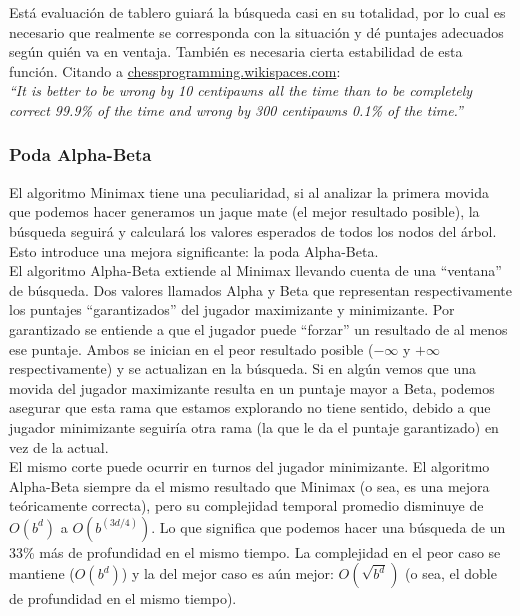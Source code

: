 \documentclass{article}
\begin{document}
\begin{multicols}{2}
Está evaluación de tablero guiará la búsqueda casi en su totalidad,
por lo cual es necesario que realmente se corresponda con la situación
y dé puntajes adecuados según quién va en ventaja. También es
necesaria cierta estabilidad de esta función. Citando a
\href{http://chessprogramming.wikispaces.com/}
{chessprogramming.wikispaces.com}:
\\

\emph{``It is better to be wrong by 10 centipawns all the time than to
be completely correct 99.9\% of the time and wrong by 300 centipawns
0.1\% of the time.''}
\\

\subsubsection{Poda Alpha-Beta}

El algoritmo Minimax tiene una peculiaridad, si al analizar la primera
movida que podemos hacer generamos un jaque mate (el mejor resultado
posible), la búsqueda seguirá y calculará los valores esperados de
todos los nodos del árbol. Esto introduce una mejora significante: la
poda Alpha-Beta.
\\

El algoritmo Alpha-Beta extiende al Minimax llevando cuenta de una
``ventana'' de búsqueda. Dos valores llamados Alpha y Beta que
representan respectivamente los puntajes ``garantizados'' del jugador
maximizante y minimizante. Por garantizado se entiende a que el jugador
puede ``forzar'' un resultado de al menos ese puntaje. Ambos se inician
en el peor resultado posible ($-\infty$ y $+\infty$ respectivamente)
y se actualizan en la búsqueda. Si en algún vemos que una movida
del jugador maximizante resulta en un puntaje mayor a Beta, podemos
asegurar que esta rama que estamos explorando no tiene sentido, debido
a que jugador minimizante seguiría otra rama (la que le da el puntaje
garantizado) en vez de la actual.
\\

El mismo corte puede ocurrir en turnos del jugador minimizante. El
algoritmo Alpha-Beta siempre da el mismo resultado que Minimax (o sea,
es una mejora teóricamente correcta), pero su complejidad temporal
promedio disminuye de $O(b^d)$ a $O(b^{(3d/4)})$\footnotemark. Lo
que significa que podemos hacer una búsqueda de un 33\% más de
profundidad en el mismo tiempo. La complejidad en el peor caso se
mantiene ($O(b^d)$) y la del mejor caso es aún mejor: $O(\sqrt{b^d})$
(o sea, el doble de profundidad en el mismo tiempo).
\\


\end{multicols}
\end{document}
